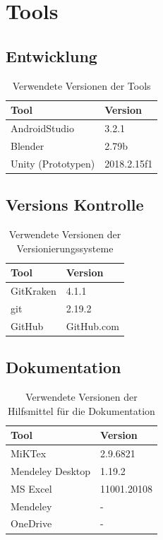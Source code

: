 \documentclass[a4paper]{scrreprt}
\begin{document}
\section{Tools}
\label{sec:Tools}
\subsection{Entwicklung}
\begin{table}[h!]
	\begin{tabular}{p{} p{}}
		\hline
		\textbf{Tool} & \textbf{Version} \\
		\hline
		AndroidStudio & 3.2.1 \\
		\hline
		Blender & 2.79b \\
		\hline
		Unity (Prototypen) & 2018.2.15f1 \\
		\hline
	\end{tabular}
	\caption{Verwendete Versionen der Tools}
\end{table}

\subsection{Versions Kontrolle}
\begin{table}[h!]
	\begin{tabular}{p{} p{}}
		\hline
		\textbf{Tool} & \textbf{Version} \\
		\hline
		GitKraken & 4.1.1 \\
		\hline
		git & 2.19.2 \\
		\hline
		GitHub & GitHub.com \\
		\hline
	\end{tabular}
	\caption{Verwendete Versionen der Versionierungssysteme}
\end{table}

\clearpage
\subsection{Dokumentation}
\begin{table}[h!]
	\begin{tabular}{p{} p{}}
		\hline
		\textbf{Tool} & \textbf{Version} \\
		\hline
		MiKTex & 2.9.6821 \\
		\hline
		Mendeley Desktop & 1.19.2 \\
		\hline
		MS Excel & 11001.20108 \\
		\hline
		Mendeley & - \\
		\hline
		OneDrive & - \\
		\hline
	\end{tabular}
	\caption{Verwendete Versionen der Hilfsmittel für die Dokumentation}
\end{table}
\end{document}
